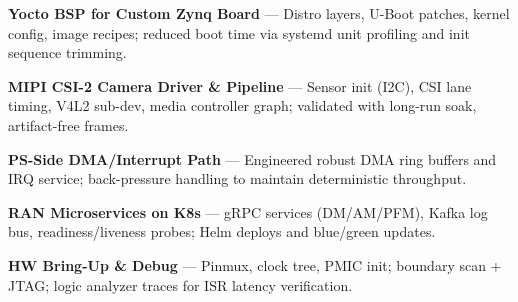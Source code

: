 
\begin{flushleft}
\textbf{Yocto BSP for Custom Zynq Board} — Distro layers, U-Boot patches, kernel config, image recipes; reduced boot time via systemd unit profiling and init sequence trimming.
\vspace{0.3\baselineskip}

\textbf{MIPI CSI-2 Camera Driver \& Pipeline} — Sensor init (I2C), CSI lane timing, V4L2 sub-dev, media controller graph; validated with long-run soak, artifact-free frames.
\vspace{0.3\baselineskip}

\textbf{PS-Side DMA/Interrupt Path} — Engineered robust DMA ring buffers and IRQ service; back-pressure handling to maintain deterministic throughput.
\vspace{0.3\baselineskip}

\textbf{RAN Microservices on K8s} — gRPC services (DM/AM/PFM), Kafka log bus, readiness/liveness probes; Helm deploys and blue/green updates.
\vspace{0.3\baselineskip}

\textbf{HW Bring-Up \& Debug} — Pinmux, clock tree, PMIC init; boundary scan + JTAG; logic analyzer traces for ISR latency verification.
\end{flushleft}